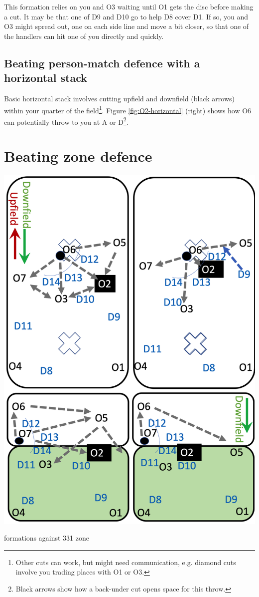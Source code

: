 \documentclass{tufte-handout}
\begin{document}
This formation relies 
on you and O3 
waiting until O1 
gets the disc 
before making a cut.  
It may be that 
one of 
D9 
and D10 
go to help D8 
cover D1.  
If so, 
you and O3 
might spread out, 
one on each side line
and move a bit closer, 
so that one of the handlers
can hit one of you directly 
and quickly. 


\subsection{Beating person-match defence with a horizontal stack}\label{sec:horizontall}
Basic horizontal stack 
involves cutting
upfield and downfield (black arrows)
within your quarter of the field\footnote{
Other cuts
can work, 
but might need
communication,
e.g. diamond cuts 
involve you trading places 
with O1 
or O3.}. 
Figure \ref{fig:O2-horizontal} (right) shows how
O6 
can potentially 
throw to you 
at A 
or D\footnote{
Black arrows
show how a back-under cut 
opens space 
for this throw.}. 

\section{Beating zone defence}\label{sec:zone}

\begin{marginfigure}%
  \includegraphics[width=\linewidth]{O2-zone331}
  \caption{formations against 331 zone}
  \label{fig:O2-zone331}
\end{marginfigure}
\end{document}
